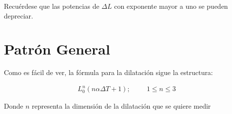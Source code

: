 \documentclass{article}
\begin{document}
Recuérdese que las potencias de \(\Delta L\) con exponente
mayor a uno se pueden depreciar.

\section*{Patrón General}

Como es fácil de ver, la fórmula para la dilatación 
sigue la estructura:

\begin{align}
    L_0^n \left( n \alpha \Delta T + 1 \right); \hspace{1cm} 1 \leq n \leq 3
\end{align}

Donde \(n\) representa la dimensión de la dilatación que 
se quiere medir
\end{document}
